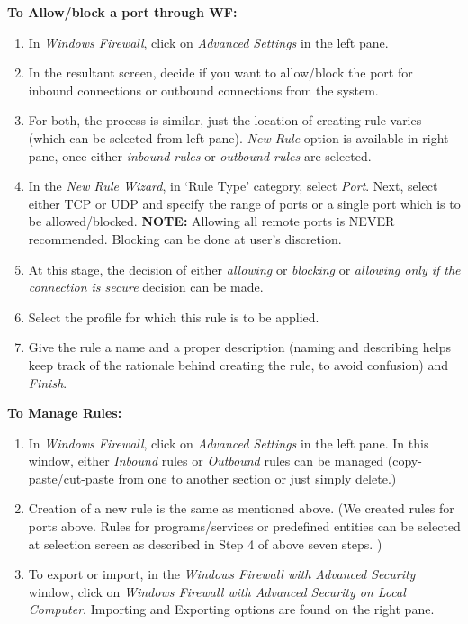 \documentclass[12pt]{extarticle}
\begin{document}
\item \textbf{To Allow/block a port through WF:}
\begin{enumerate}
\item In \textit{Windows Firewall}, click on \textit{Advanced Settings} in the left pane. 
\item In the resultant screen, decide if you want to allow/block the port for inbound connections or outbound connections from the system. 
\item For both, the process is similar, just the location of creating rule varies (which can be selected from left pane). \textit{New Rule} option is available in right pane, once either \textit{inbound rules} or \textit{outbound rules} are selected.
\item In the \textit{New Rule Wizard}, in `Rule Type' category, select \textit{Port}. Next, select either TCP or UDP and specify the range of ports or a single port which is to be allowed/blocked.
\textbf{NOTE:} Allowing all remote ports is NEVER recommended. Blocking can be done at user's discretion.
\item At this stage, the decision of either \textit{allowing} or \textit{blocking} or \textit{allowing only if the connection is secure} decision can be made.
\item Select the profile for which this rule is to be applied.
\item Give the rule a name and a proper description (naming and describing helps keep track of the rationale behind creating the rule, to avoid confusion) and \textit{Finish}.
\end{enumerate}

\item \textbf{To Manage Rules:}
\begin{enumerate}
\item In \textit{Windows Firewall}, click on \textit{Advanced Settings} in the left pane. In this window, either \textit{Inbound} rules or \textit{Outbound} rules can be managed (copy-paste/cut-paste from one to another section or just simply delete.)
\item Creation of a new rule is the same as mentioned above. (We created rules for ports above. Rules for programs/services or predefined entities can be selected at selection screen as described in Step 4 of above seven steps. )  
\item  To export or import, in the \textit{Windows Firewall with Advanced Security} window, click on \textit{Windows Firewall with Advanced Security on Local Computer}. Importing and Exporting options are found on the right pane.
\end{enumerate}
\end{document}
